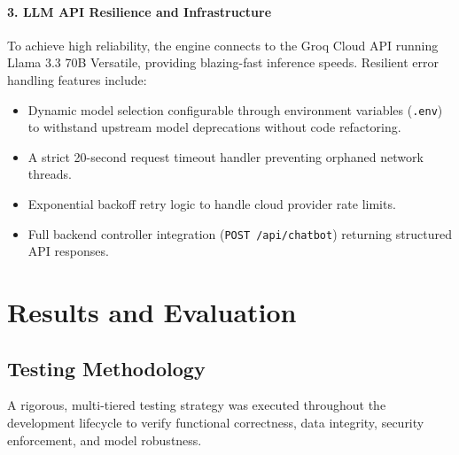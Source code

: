 \documentclass[12pt,a4paper,twoside,openright]{report}
\begin{document}
\subsubsection{3. LLM API Resilience and Infrastructure}
To achieve high reliability, the engine connects to the Groq Cloud API running Llama 3.3 70B Versatile, providing blazing-fast inference speeds. Resilient error handling features include:
\begin{itemize}[leftmargin=*]
    \item Dynamic model selection configurable through environment variables (\texttt{.env}) to withstand upstream model deprecations without code refactoring.
    \item A strict 20-second request timeout handler preventing orphaned network threads.
    \item Exponential backoff retry logic to handle cloud provider rate limits.
    \item Full backend controller integration (\texttt{POST /api/chatbot}) returning structured API responses.
\end{itemize}

\cleardoublepage

\chapter{Results and Evaluation}

\section{Testing Methodology}

A rigorous, multi-tiered testing strategy was executed throughout the development lifecycle to verify functional correctness, data integrity, security enforcement, and model robustness.
\end{document}
